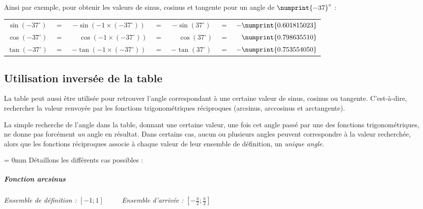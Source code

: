 \documentclass[a4paper]{article}
\begin{document}
			\vspace{4 mm}

			{ \parindent=0cm Ainsi par exemple, pour obtenir les valeurs de sinus, cosinus et tangente pour un angle de $\numprint{-37}^\circ$ :}

			\vspace{1 mm}

			\begin{tabular}{ccccccc}
				$\sin(-37^\circ)$&$=$&$-\sin(-1 \times (-37^\circ))$& $=$ & $-\sin(37^\circ)$           & $=$ & $-\numprint{0.601815023}$\\
				$\cos(-37^\circ)$&$=$&$\phantom{-}\cos(-1 \times (-37^\circ))$ & $=$ & $\phantom{-}\cos(37^\circ)$ & $=$ & $\phantom{-}\numprint{0.798635510}$\\
				$\tan(-37^\circ)$&$=$&$-\tan(-1 \times (-37^\circ))$& $=$ & $-\tan(37^\circ)$           & $=$ & $-\numprint{0.753554050}$\\
			\end{tabular}

		\subsection{Utilisation inversée de la table}

			La table peut aussi être utilisée pour retrouver l'angle correspondant à une certaine valeur de sinus, cosinus ou tangente.
			C'est-à-dire, rechercher la valeur renvoyée par les fonctions trigonométriques réciproques (arcsinus, arccosinus et arctangente).

			\vspace{2 mm}

			La simple recherche de l'angle dans la table, donnant une certaine valeur,
			une fois cet angle passé par une des fonctions trigonométriques, ne donne pas forcément \emph{un} angle en résultat.
			Dans certains cas, aucun ou plusieurs angles peuvent correspondre à la valeur recherchée, 
			alors que les fonctions réciproques associe à chaque valeur de leur ensemble de définition, un \emph{unique angle}.

			\vspace{3 mm}

			{\parindent = 0mm Détaillons les différents cas possibles :}

				\vspace{-4 mm}

				\subparagraph*{Fonction arcsinus}
					\textit{Ensemble de définition : $[-1;1]$} ~~~~	\textit{Ensemble d'arrivée : $\left[-\frac{\pi}{2};\frac{\pi}{2}\right]$}
\end{document}
